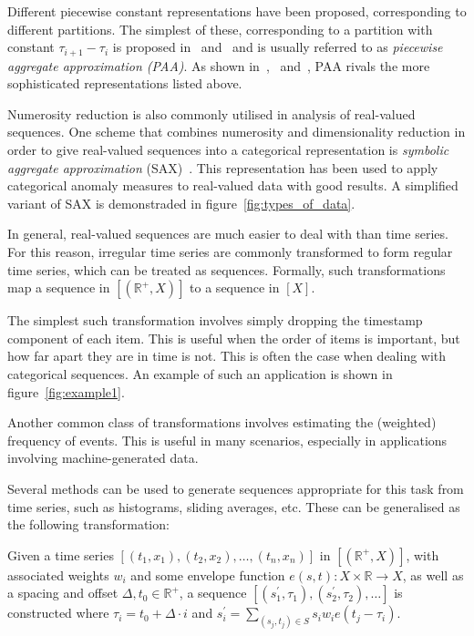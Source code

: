 Different piecewise constant representations have been proposed, corresponding to different partitions. The simplest of these, corresponding to a partition with constant $\tau_{i+1} - \tau_i$ is proposed in~\cite{keogh4} and~\cite{faloutsos2} and is usually referred to as \emph{piecewise aggregate approximation (PAA)}. As shown in~\cite{keogh5},~\cite{keogh3} and~\cite{faloutsos2}, PAA rivals the more sophisticated representations listed above.

Numerosity reduction is also commonly utilised in analysis of real-valued sequences. One scheme that combines numerosity and dimensionality reduction in order to give real-valued sequences into a categorical representation is \emph{symbolic aggregate approximation} (SAX)~\cite{sax}. This representation has been used to apply categorical anomaly measures to real-valued data with good results. A simplified variant of SAX is demonstraded in figure~\ref{fig:types_of_data}.

In general, real-valued sequences are much easier to deal with than time series. For this reason, irregular time series are commonly transformed to form regular time series, which can be treated as sequences. Formally, such transformations map a sequence in $[(\mathbb{R}^+, X)]$ to a sequence in $[X]$.

The simplest such transformation involves simply dropping the timestamp component of each item. This is useful when the order of items is important, but how far apart they are in time is not. This is often the case when dealing with categorical sequences. An example of such an application is shown in figure~\ref{fig:example1}.

Another common class of transformations involves estimating the (weighted) frequency of events. This is useful in many scenarios, especially in applications involving machine-generated data.

Several methods can be used to generate sequences appropriate for this task from time series, such as histograms, sliding averages, etc. These can be generalised as the following transformation:

Given a time series $[(t_1, x_1), (t_2, x_2), \dots, (t_n, x_n)]$ in $[(\mathbb{R}^+, X)]$, with associated weights $w_i$ and some envelope function $e(s, t): X \times \mathbb{R} \rightarrow X$, as well as a spacing and offset $\Delta, t_0 \in \mathbb{R}^+$, a sequence $[(s_{1}^{'}, \tau_1), (s_{2}^{'}, \tau_2), \dots]$ is constructed where $\tau_i = t_0 + \Delta \cdot i$ and $s_{i}^{'} = \sum_{(s_j, t_j) \in S} s_i w_i e(t_j - \tau_i)$.


